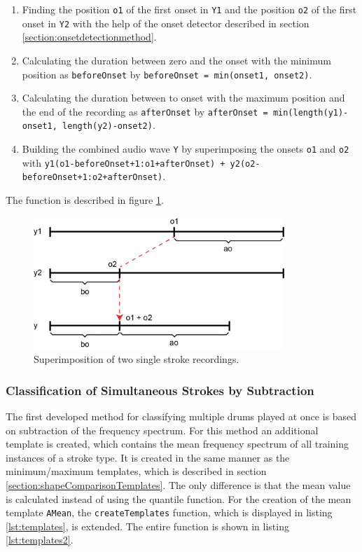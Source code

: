 \begin{enumerate}
  \item Finding the position \lstinline{o1} of the first onset in \lstinline{Y1} and the position \lstinline{o2} of the first onset in \lstinline{Y2} with the help of the onset detector described in section \ref{section:onsetdetectionmethod}.
	\item Calculating the duration between zero and the onset with the minimum position as \lstinline{beforeOnset} by \lstinline{beforeOnset = min(onset1, onset2)}.
	\item Calculating the duration between to onset with the maximum position and the end of the recording as \lstinline{afterOnset} by \lstinline{afterOnset = min(length(y1)-onset1, length(y2)-onset2)}.
	\item Building the combined audio wave \lstinline{Y} by superimposing the onsets \lstinline{o1} and \lstinline{o2} with \lstinline{y1(o1-beforeOnset+1:o1+afterOnset) + y2(o2-beforeOnset+1:o2+afterOnset)}.
\end{enumerate}

The function is described in figure \ref{fig:superimpose}.

\begin{figure}[htb]
	\centering
	\includegraphics[height=5cm]{images/superimposition.png}
	\caption{Superimposition of two single stroke recordings.}
	\label{fig:superimpose}
\end{figure}

\subsubsection{Classification of Simultaneous Strokes by Subtraction}

The first developed method for classifying multiple drums played at once is based on subtraction of the frequency spectrum. For this method an additional template is created, which contains the mean frequency spectrum of all training instances of a stroke type. It is created in the same manner as the minimum/maximum templates, which is described in section \ref{section:shapeComparisonTemplates}. The only difference is that the mean value is calculated instead of using the quantile function. For the creation of the mean template \lstinline{AMean}, the \lstinline{createTemplates} function, which is displayed in listing \ref{lst:templates}, is extended. The entire function is shown in listing \ref{lst:templates2}.

